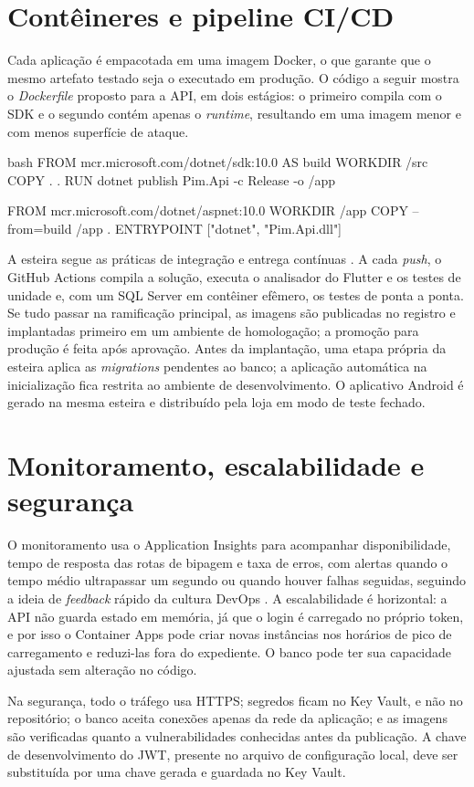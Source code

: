 \section{Contêineres e pipeline CI/CD}

Cada aplicação é empacotada em uma imagem Docker, o que garante que o mesmo artefato testado seja o executado em produção. O código a seguir mostra o \textit{Dockerfile} proposto para a API, em dois estágios: o primeiro compila com o SDK e o segundo contém apenas o \textit{runtime}, resultando em uma imagem menor e com menos superfície de ataque.

\begin{codeblock}{bash}
FROM mcr.microsoft.com/dotnet/sdk:10.0 AS build
WORKDIR /src
COPY . .
RUN dotnet publish Pim.Api -c Release -o /app

FROM mcr.microsoft.com/dotnet/aspnet:10.0
WORKDIR /app
COPY --from=build /app .
ENTRYPOINT ["dotnet", "Pim.Api.dll"]
\end{codeblock}

A esteira segue as práticas de integração e entrega contínuas \cite{humble2014}. A cada \textit{push}, o GitHub Actions compila a solução, executa o analisador do Flutter e os testes de unidade e, com um SQL Server em contêiner efêmero, os testes de ponta a ponta. Se tudo passar na ramificação principal, as imagens são publicadas no registro e implantadas primeiro em um ambiente de homologação; a promoção para produção é feita após aprovação. Antes da implantação, uma etapa própria da esteira aplica as \textit{migrations} pendentes ao banco; a aplicação automática na inicialização fica restrita ao ambiente de desenvolvimento. O aplicativo Android é gerado na mesma esteira e distribuído pela loja em modo de teste fechado.

\section{Monitoramento, escalabilidade e segurança}

O monitoramento usa o Application Insights para acompanhar disponibilidade, tempo de resposta das rotas de bipagem e taxa de erros, com alertas quando o tempo médio ultrapassar um segundo ou quando houver falhas seguidas, seguindo a ideia de \textit{feedback} rápido da cultura DevOps \cite{kim2018}. A escalabilidade é horizontal: a API não guarda estado em memória, já que o login é carregado no próprio token, e por isso o Container Apps pode criar novas instâncias nos horários de pico de carregamento e reduzi-las fora do expediente. O banco pode ter sua capacidade ajustada sem alteração no código.

Na segurança, todo o tráfego usa HTTPS; segredos ficam no Key Vault, e não no repositório; o banco aceita conexões apenas da rede da aplicação; e as imagens são verificadas quanto a vulnerabilidades conhecidas antes da publicação. A chave de desenvolvimento do JWT, presente no arquivo de configuração local, deve ser substituída por uma chave gerada e guardada no Key Vault.
